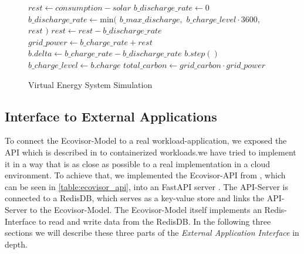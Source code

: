 \begin{figure}
    \removelatexerror
    \begin{algorithm}[H]
        \caption{Virtual Energy System Simulation}
        \label{alg:virtual_energy_system_simulation}
        $rest \gets consumption - solar$\;
         {
            $b\_discharge\_rate \gets 0$\;
        }{
            $b\_discharge\_rate \gets \text{min}($\;
            \Indp
                $b\_max\_discharge,$\;
                $b\_charge\_level \cdot 3600,$\;
                $rest$\;
            \Indm
            $)$\;
            $rest \gets rest - b\_discharge\_rate$\;
        }
        $grid\_power \gets b\_charge\_rate + rest$\;
        $b.delta \gets b\_charge\_rate - b\_discharge\_rate$\;
        $b.step()$\;
        $b\_charge\_level \gets b.charge$\;
        $total\_carbon \gets grid\_carbon \cdot grid\_power$\;
        \vspace{3mm}
    \end{algorithm}
\end{figure}

\subsection{Interface to External Applications}


To connect the Ecovisor-Model to a real workload-application, we exposed the API which is described in \cite{souza2023} to containerized workloads.we have tried to implement it in a way that is as close as possible to a real implementation in a cloud environment.
To achieve that, we implemented the Ecovisor-API from \cite{souza2023}, which can be seen in \ref{table:ecovisor_api}, into an FastAPI server \cite{fastapi}.
The API-Server is connected to a RedisDB\cite{redis}, which serves as a key-value store and links the API-Server to the Ecovisor-Model. 
The Ecovisor-Model itself implements an Redis-Interface to read and write data from the RedisDB.
In the following three sections we will describe these three parts of the \textit{External Application Interface} in depth.

